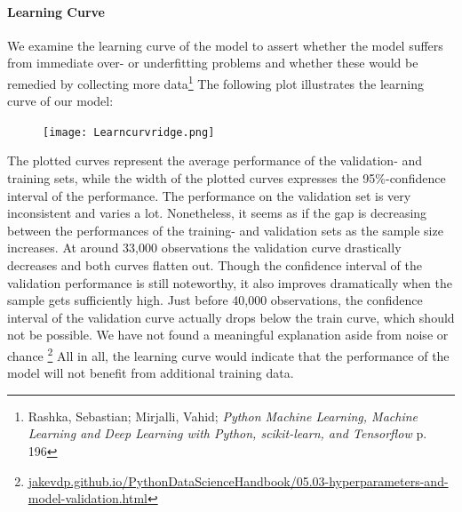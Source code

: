 \documentclass[12pt,a4paper]{article}
\begin{document}
\paragraph{Learning Curve\newline}
We examine the learning curve of the model to assert whether the model suffers from immediate over- or underfitting problems and whether these would be remedied by collecting more data\footnote{Rashka, Sebastian; Mirjalli, Vahid; \textit{Python Machine Learning, Machine Learning and Deep Learning with Python, scikit-learn, and Tensorflow} p. 196}
The following plot illustrates the learning curve of our model:
\begin{figure}[H]
\centering
\caption{}
\texttt{[image: Learncurvridge.png]}
\end{figure}
The plotted curves represent the average performance of the validation- and training sets, while the width of the plotted curves expresses the 95\%-confidence interval of the performance.  
The performance on the validation set is very inconsistent and varies a lot. Nonetheless, it seems as if the gap is decreasing between the performances of the training- and validation sets as the sample size increases. 
At around 33,000 observations the validation curve drastically decreases and both curves flatten out. Though the confidence interval of the validation performance is still noteworthy, it also improves dramatically when the sample gets sufficiently high. Just before 40,000 observations, the confidence interval of the validation curve actually drops below the train curve, which should not be possible. We have not found a meaningful explanation aside from noise or chance \footnote{\href{https://jakevdp.github.io/PythonDataScienceHandbook/05.03-hyperparameters-and-model-validation.html}{jakevdp.github.io/PythonDataScienceHandbook/05.03-hyperparameters-and-model-validation.html}} 
All in all, the learning curve would indicate that the performance of the model will not benefit from additional training data. 
\end{document}
